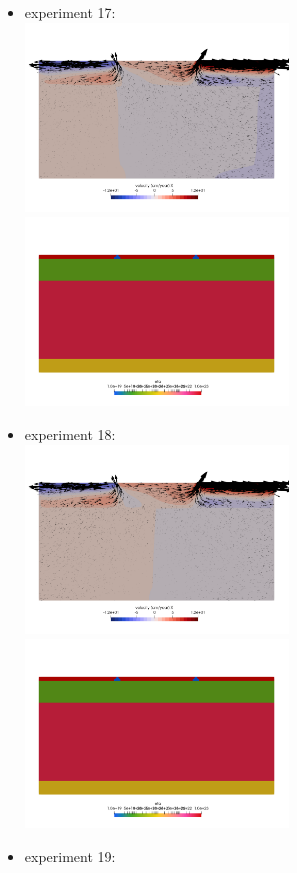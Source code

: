 \newpage
\begin{itemize}
\item experiment 17:\\
\includegraphics[width=7cm]{python_codes/fieldstone_148/results/vels_0016}
\includegraphics[width=7cm]{python_codes/fieldstone_148/results/etas_0016}
\item experiment 18:\\
\includegraphics[width=7cm]{python_codes/fieldstone_148/results/vels_0017}
\includegraphics[width=7cm]{python_codes/fieldstone_148/results/etas_0017}
\item experiment 19:\\

\end{itemize}
